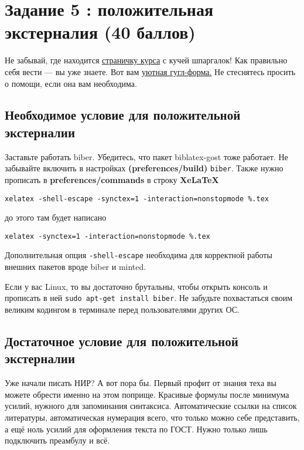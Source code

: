 \documentclass[12pt, a4paper, oneside]{article}
\begin{document}
	
\section*{Задание 5 :  положительная экстерналия (40  баллов) }
	
Не забывай, где находится  \href{https://fulyankin.github.io/LaTeX/}{страничку курса} с кучей шпаргалок! Как правильно себя вести — вы уже знаете. Вот вам \href{https://docs.google.com/forms/d/e/1FAIpQLSe11kxKVfv07iCL1E9yNX7ll9swKImiVwRr1H70lslGzInRSg/viewform}{уютная гугл-форма.}   Не стеснятесь просить о помощи, если она вам необходима.
	

\subsection*{Необходимое условие для положительной экстерналии }

Заставьте работать biber. Убедитесь, что пакет biblatex-gost тоже работает.  Не забывайте включить в настройках \textbf{(preferences/build)}  \texttt{biber}. Также нужно прописать в \textbf{preferences/commands} в строку \textbf{XeLaTeX}

 \texttt{xelatex -shell-escape -synctex=1 -interaction=nonstopmode \%.tex}
 
до этого там будет написано
 
  \texttt{xelatex -synctex=1 -interaction=nonstopmode \%.tex}
  
Дополнительная опция \texttt{-shell-escape} необходима для корректной работы внешних пакетов вроде biber и minted.

Если у вас Linux, то вы достаточно брутальны, чтобы открыть консоль и прописать в ней  \texttt{sudo apt-get install biber}. Не забудьте похвастаться своим великим кодингом в терминале перед пользователями других ОС.

\subsection*{Достаточное условие  для положительной экстерналии}

Уже начали писать НИР? А вот пора бы. Первый профит от знания теха вы можете обрести именно на этом поприще.  Красивые формулы после минимума усилий, нужного для запоминания синтаксиса. Автоматические ссылки на список литературы, автоматическая нумерация всего, что только можно себе представить, а ещё ноль усилий для оформления текста по ГОСТ. Нужно только лишь подключить преамбулу и всё. 
\end{document}
